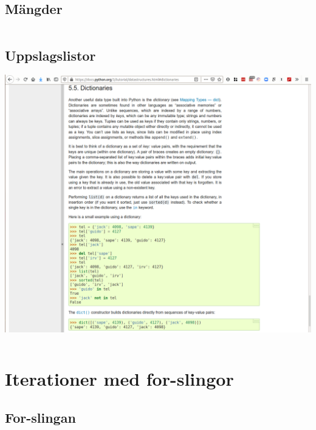 \subsection{Mängder}

\begin{frame}[fragile]
  \begin{example}[sets.py]
    \inputminted{python}{examples/sets.py}
  \end{example}
\end{frame}


\subsection{Uppslagslistor}

\begin{frame}
  \includegraphics[width=\columnwidth]{figs/docs-dicts.png}
\end{frame}

\begin{frame}[fragile]
  \begin{example}
    \inputminted{python}{examples/phone-small.py}
  \end{example}
\end{frame}


\section{Iterationer med for-slingor}

\subsection{For-slingan}

